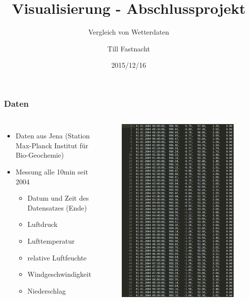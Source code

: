 \documentclass{beamer}
\author{Till Fastnacht}
\title{Visualisierung - Abschlussprojekt}
\subtitle{Vergleich von Wetterdaten}
\date{2015/12/16}
\institute{Bauhaus-Universität Weimar}
\begin{document}
  \begin{frame}
  \titlepage
  \end{frame}
  
  \begin{frame}
  \frametitle{Daten}
    \begin{columns}
	\begin{itemize}
	  \item Daten aus Jena (Station Max-Planck Institut für Bio-Geochemie)
	  \item Messung alle 10min seit 2004
	  \begin{itemize}
	    \item Datum und Zeit des Datensatzes (Ende)
	    \item Luftdruck
	    \item Lufttemperatur
	    \item relative Luftfeuchte
	    \item Windgeschwindigkeit
	    \item Niederschlag
	  \end{itemize}
	\end{itemize}
	\begin{figure}[h]
	\centering
	    \includegraphics[width=.3\paperwidth,keepaspectratio=true]{./media/data.png}

\end{figure}
\end{columns}
\end{frame}
\end{document}
